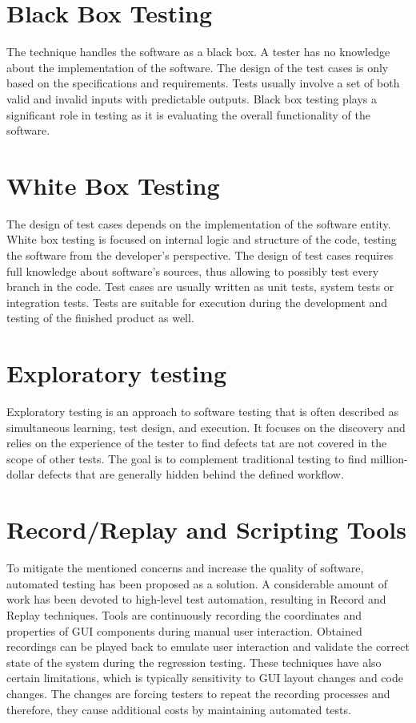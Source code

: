\section{Black Box Testing}
The technique handles the software as a black box. A tester has no knowledge about the implementation of the software. The design of the test cases is only based on the specifications and requirements. Tests usually involve a set of both valid and invalid inputs with predictable outputs. Black box testing plays a significant role in testing as it is evaluating the overall functionality of the software.\cite{white_black}

\section{White Box Testing}
The design of test cases depends on the implementation of the software entity. White box testing is focused on internal logic and structure of the code, testing the software from the developer's perspective. The design of test cases requires full knowledge about software's sources, thus allowing to possibly test every branch in the code. Test cases are usually written as unit tests, system tests or integration tests. Tests are suitable for execution during the development and testing of the finished product as well.\cite{white_black}

\section{Exploratory testing}
Exploratory testing is an approach to software testing that is often described as simultaneous learning, test design, and execution. It focuses on the discovery and relies on the experience of the tester to find defects tat are not covered in the scope of other tests. The goal is to complement traditional testing to find million-dollar defects that are generally hidden behind the defined workflow.\cite{exploratory_testing}

\section{Record/Replay and Scripting Tools}\label{record_replay}
To mitigate the mentioned concerns and increase the quality of software, automated testing has been proposed as a solution. A considerable amount of work has been devoted to high-level test automation, resulting in Record and Replay techniques. Tools are continuously recording the coordinates and properties of GUI components during manual user interaction. Obtained recordings can be played back to emulate user interaction and validate the correct state of the system during the regression testing. These techniques have also certain limitations, which is typically sensitivity to GUI layout changes and code changes. The changes are forcing testers to repeat the recording processes and therefore, they cause additional costs by maintaining automated tests.\cite{guitesting} 

